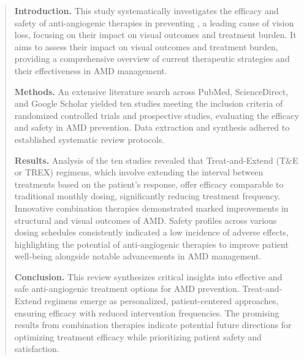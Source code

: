 \begin{abstract}\label{abstract}

\noindent \textbf{Introduction.}
This study systematically investigates the efficacy and safety of anti-angiogenic therapies in preventing \AMD, a leading cause of vision loss, focusing on their impact on visual outcomes and treatment burden. It aims to assess their impact on visual outcomes and treatment burden, providing a comprehensive overview of current therapeutic strategies and their effectiveness in AMD management.\par

\noindent \textbf{Methods.}
An extensive literature search across PubMed, ScienceDirect, and Google Scholar yielded ten studies meeting the inclusion criteria of randomized controlled trials and prospective studies, evaluating the efficacy and safety in AMD prevention. Data extraction and synthesis adhered to established systematic review protocols.\par

\noindent \textbf{Results.}
Analysis of the ten studies revealed that Treat-and-Extend (T\&E or TREX) regimens, which involve extending the interval between treatments based on the patient's response, offer efficacy comparable to traditional monthly dosing, significantly reducing treatment frequency. Innovative combination therapies demonstrated marked improvements in structural and visual outcomes of AMD. Safety profiles across various dosing schedules consistently indicated a low incidence of adverse effects, highlighting the potential of anti-angiogenic therapies to improve patient well-being alongside notable advancements in AMD management.\par

\noindent \textbf{Conclusion.}
This review synthesizes critical insights into effective and safe anti-angiogenic treatment options for AMD prevention. Treat-and-Extend regimens emerge as personalized, patient-centered approaches, ensuring efficacy with reduced intervention frequencies. The promising results from combination therapies indicate potential future directions for optimizing treatment efficacy while prioritizing patient safety and satisfaction.

\end{abstract}
